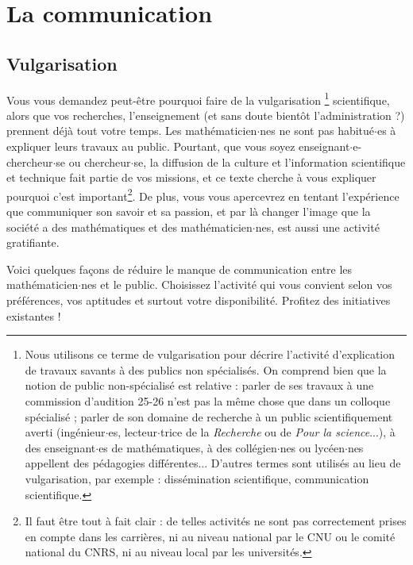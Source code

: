 \chapter{La communication}

\section{Vulgarisation}

Vous vous demandez peut-\^etre pourquoi faire de la vulgarisation
\footnote{Nous utilisons ce terme de vulgarisation pour d\'ecrire l'activit\'e d'explication de travaux
 savants \`a des publics non sp\'ecialis\'es. On comprend bien que la notion de public non-sp\'ecialis\'e est relative :
 parler de ses travaux \`a une commission d'audition 25-26 n'est pas la m\^eme chose que dans un colloque sp\'ecialis\'e ;
 parler de son domaine de recherche \`a un public scientifiquement averti (ing\'enieur$\cdot$es, lecteur$\cdot$trice de la
{\it Recherche} ou de {\it Pour la science}...), \`a des enseignant$\cdot$es de math\'ematiques, \`a des
coll\'egien$\cdot$nes ou lyc\'een$\cdot$nes appellent des p\'edagogies diff\'erentes...  D'autres termes sont utilis\'es
au lieu de vulgarisation, par exemple : diss\'emination scientifique, communication scientifique.} scientifique,
alors que vos recherches, l'enseignement (et sans doute bient\^ot l'administration ?) prennent d\'ej\`a tout votre temps.
Les math\'ematicien$\cdot$nes ne sont pas habitu\'e$\cdot$es \`a expliquer leurs travaux au public.
Pourtant, que vous soyez enseignant$\cdot$e-chercheur$\cdot$se ou chercheur$\cdot$se, la diffusion de la culture et l'information
scientifique et technique fait partie de vos missions, et ce texte cherche \`a vous expliquer pourquoi c'est
 important\footnote{Il faut \^etre tout \`a fait clair : de telles
activit\'es ne sont pas correctement prises en compte dans les carri\`eres, ni au niveau national par le CNU
ou le comit\'e national du CNRS, ni au niveau local par les universit\'es.}.
De plus, vous vous apercevrez en tentant l'exp\'erience que communiquer son savoir et sa passion, et
par l\`a changer l'image que la soci\'et\'e a des math\'ematiques et des math\'ematicien$\cdot$nes, est aussi une activit\'e gratifiante.

Voici quelques fa\c cons de r\'eduire le manque de communication entre les math\'ematicien$\cdot$nes et le public.
Choisissez l'activit\'e qui vous convient selon vos pr\'ef\'erences, vos aptitudes et surtout votre disponibilit\'e.
Profitez des initiatives existantes !

